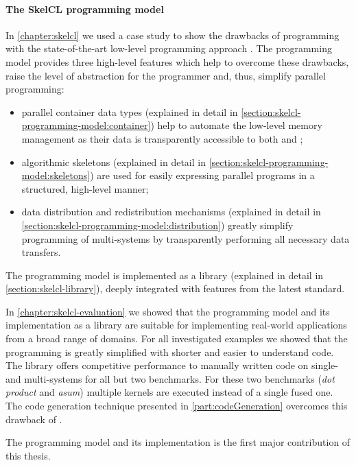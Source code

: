 \paragraph{The SkelCL programming model}
In \autoref{chapter:skelcl} we used a case study to show the drawbacks of programming with the state-of-the-art low-level programming approach \OpenCL.
The \SkelCL programming model provides three high-level features which help to overcome these drawbacks, raise the level of abstraction for the programmer and, thus, simplify parallel programming:
\begin{itemize}
  \item parallel container data types (explained in detail in \autoref{section:skelcl-programming-model:container}) help to automate the low-level memory management as their data is transparently accessible to both \CPU and \GPUs;
  \item algorithmic skeletons (explained in detail in \autoref{section:skelcl-programming-model:skeletons}) are used for easily expressing parallel programs in a structured, high-level manner;
  \item data distribution and redistribution mechanisms (explained in detail in \autoref{section:skelcl-programming-model:distribution}) greatly simplify programming of multi-\GPU systems by transparently performing all necessary data transfers.
\end{itemize}

\noindent
The \SkelCL programming model is implemented as a \Cpp library (explained in detail in \autoref{section:skelcl-library}), deeply integrated with features from the latest \Cpp standard.

In \autoref{chapter:skelcl-evaluation} we showed that the \SkelCL programming model and its implementation as a \Cpp library are suitable for implementing real-world applications from a broad range of domains.
For all investigated examples we showed that the programming is greatly simplified with shorter and easier to understand code.
The \SkelCL library offers competitive performance to manually written \OpenCL code on single- and multi-\GPU systems for all but two benchmarks.
For these two benchmarks (\emph{dot product} and \emph{asum}) multiple \OpenCL kernels are executed instead of a single fused one.
The code generation technique presented in \autoref{part:codeGeneration} overcomes this drawback of \SkelCL.

\bigskip
The \SkelCL programming model and its implementation is the first major contribution of this thesis.

